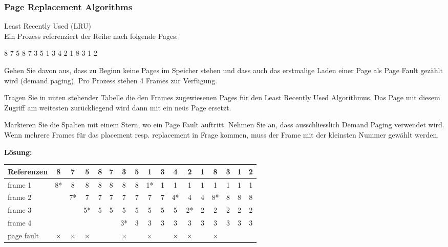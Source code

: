 \subsubsection{Page Replacement Algorithms}

\begin{example2}{Least Recently Used (LRU)}\\
    Ein Prozess referenziert der Reihe nach folgende Pages:
    \begin{center}
    8 7 5 8 7 3 5 1 3 4 2 1 8 3 1 2
    \end{center}
    
    Gehen Sie davon aus, dass zu Beginn keine Pages im Speicher stehen und dass auch das erstmalige Laden einer Page als Page Fault gezählt wird (demand paging). Pro Prozess stehen 4 Frames zur Verfügung.
    
    Tragen Sie in unten stehender Tabelle die den Frames zugewiesenen Pages für den Least Recently Used Algorithmus. Das Page mit diesem Zugriff am weitesten zurückliegend wird dann mit ein neüs Page ersetzt.
    
    Markieren Sie die Spalten mit einem Stern, wo ein Page Fault auftritt. Nehmen Sie an, dass ausschliesslich Demand Paging verwendet wird. Wenn mehrere Frames für das placement resp. replacement in Frage kommen, muss der Frame mit der kleinsten Nummer gewählt werden.
    
    \tcblower
    
    \textbf{Lösung:}
    
    \begin{center}
    \begin{tabular}{|l|c|c|c|c|c|c|c|c|c|c|c|c|c|c|c|c|}
    \hline
    Referenzen & 8 & 7 & 5 & 8 & 7 & 3 & 5 & 1 & 3 & 4 & 2 & 1 & 8 & 3 & 1 & 2 \\
    \hline
    frame 1 & 8* & 8 & 8 & 8 & 8 & 8 & 8 & 1* & 1 & 1 & 1 & 1 & 1 & 1 & 1 & 1 \\
    \hline
    frame 2 & & 7* & 7 & 7 & 7 & 7 & 7 & 7 & 7 & 4* & 4 & 4 & 8* & 8 & 8 & 8 \\
    \hline
    frame 3 & & & 5* & 5 & 5 & 5 & 5 & 5 & 5 & 5 & 2* & 2 & 2 & 2 & 2 & 2 \\
    \hline
    frame 4 & & & & & & 3* & 3 & 3 & 3 & 3 & 3 & 3 & 3 & 3 & 3 & 3 \\
    \hline
    page fault & × & × & × & & & × & & × & & × & × & & × & & & \\
    \hline
    \end{tabular}
    \end{center}
    

\end{example2}
